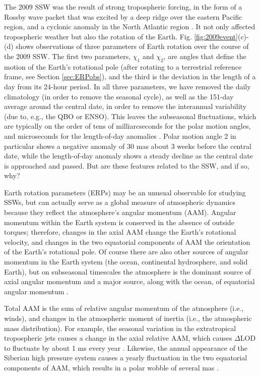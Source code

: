 \documentclass[draft,jgrga]{agutex}
\begin{document}
\begin{article}
The 2009 SSW was the result of strong tropospheric forcing, in the form of a Rossby wave packet that was excited by a deep ridge over the eastern Pacific region, and a cyclonic anomaly in the North Atlantic region \citep{ayarzaguenaetal2011}.
It not only affected  tropospheric weather but also the rotation of the Earth.
Fig. \ref{fig:2009event}(c)-(d) shows observations of three parameters of Earth rotation over the course of the 2009 SSW.  
The first two parameters, $\chi_1$ and $\chi_2$, are angles that define the motion of the Earth's rotational pole  {(after rotating to a terrestrial reference frame, see Section} \ref{sec:ERPobs}), and the third is the deviation in the length of a day from its 24-hour period.
 {In all three parameters, we have removed the daily climatology (in order to remove the seasonal cycle), as well as the 151-day average around the central date, in order to remove the interannual variability (due to, e.g., the QBO or ENSO).
This leaves the subseasonal fluctuations, which are typically on the order of tens of milliarcseconds for the polar motion angles, and microseconds for the length-of-day anomalies} \citep{salsteinrosen1989, eubanksetal1985,rosenetal1991}.  
 {Polar motion angle 2 in particular shows a negative anomaly of 30 mas about 3 weeks before the central date, while the length-of-day anomaly shows a steady decline as the central date is approached and passed.  
But are these features related to the SSW, and if so, why?}

Earth rotation parameters (ERPs) may be an unusual observable for studying SSWs, but can actually serve as a global measure of  atmospheric dynamics because they reflect the atmosphere's angular momentum (AAM).  
Angular momentum within the Earth system is conserved in the absence of outside torques; therefore, changes in the axial AAM   change the Earth's rotational velocity, and changes in the two equatorial components of AAM  the orientation of the Earth's rotational pole.
Of course there are also other sources of angular momentum in the Earth system (the ocean, continental hydrosphere, and solid Earth), but on subseasonal timescales the atmosphere is the dominant source of axial angular momentum \citep{Rosen1983,eubanksetal1985} and a major source, along with the ocean, of equatorial angular momentum  \citep{dobslawetal2010}. 

Total AAM is the sum of relative angular momentum of the atmosphere (i.e., winds), and changes in the atmospheric moment of inertia (i.e., the atmospheric mass distribution).
For example, the seasonal variation in the extratropical tropospheric jets causes a change in the axial relative AAM, which causes $\Delta$LOD to fluctuate by about 1 ms every year \citep{hideetal1997}.
Likewise, the annual appearance of the Siberian high pressure system  {causes} a yearly fluctuation in the two equatorial components of AAM, which results in a polar wobble of several mas \citep{chao_au1991,nastulaetal2009,dobslawetal2010}.


\end{article}
\end{document}
